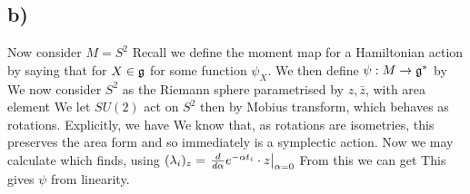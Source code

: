 \documentclass{article}
\begin{document}
\subsection{b)}
Now consider $M=S^2$  
Recall we define the moment map for a Hamiltonian action by saying that for $X \in \mathfrak{g}$
for some function $\psi_X$. We then define $\psi : M \to \mathfrak{g}^\ast$ by 
We now consider $S^2$ as the Riemann sphere parametrised by $z,\bar{z}$, with area element 
We let $SU(2)$ act on $S^2$ then by Mobius transform, which behaves as rotations. Explicitly, we have 
We know that, as rotations are isometries, this preserves the area form and so immediately is a symplectic action. Now we may calculate
which finds, using $(\lambda_i)_z = \left. \frac{d}{d\alpha}e^{-\alpha t_i} \cdot z \right\rvert_{\alpha = 0}$ 
From this we can get 
This gives $\psi$ from linearity.
\end{document}
